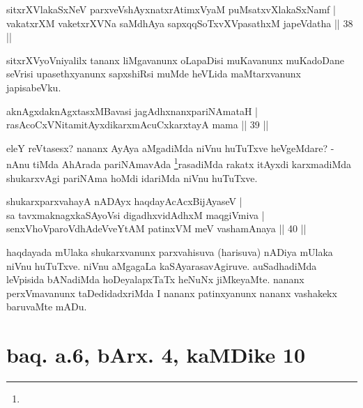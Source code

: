 
\begin{shl}
sitxrXVlakaSxNeV parxveVshAyxnatxrAtimxVyaM puMsatxvXlakaSxNamf | \\
vakatxrXM vaketxrXVNa saMdhAya sapxqqSoTxvXVpasathxM japeVdatha \hfill|| 38 || 
\end{shl}

\begin{artha}
sitxrXVyoVniyalilx tananx liMgavanunx oLapaDisi muKavanunx muKadoDane 
seVrisi upasethxyanunx sapxshiRsi muMde heVLida maMtarxvanunx 
japisabeVku.
\end{artha}


\begin{shl}
aknAgxdaknAgxtasxMBavasi jagAdhxnanxpariNAmataH | \\
rasAcoCxVNitamitAyxdikarxmAcuCxkarxtayA mama \hfill|| 39 || 
\end{shl}

\begin{artha}
eleY reVtasesx? nananx AyAya aMgadiMda niVnu huTuTxve heVgeMdare? - 
nAnu tiMda AhArada pariNAmavAda \footnote[1]{}rasadiMda rakatx itAyxdi 
karxmadiMda shukarxvAgi pariNAma hoMdi idariMda niVnu huTuTxve.
\end{artha}


\begin{shl}
shukarxparxvahayA nADAyx haqdayAcAcxBijAyaseV | \\
sa tavxmaknagxkaSAyoV\s si digadhxvidAdhxM maqgiVmiva | \\
senxVhoVparoVdhAdeVveYtAM patinxVM meV vashamAnaya \hfill|| 40 || 
\end{shl}

\begin{artha}
haqdayada mUlaka shukarxvanunx parxvahisuva (harisuva) nADiya mUlaka 
niVnu huTuTxve. niVnu aMgagaLa kaSAyarasavAgiruve. auSadhadiMda 
leVpisida bANadiMda hoDeyalapxTaTx heNuNx jiMkeyaMte. nananx 
perxVmavanunx taDedidadxriMda I nananx patinxyanunx nananx vashakekx 
baruvaMte mADu.
\end{artha}

\section*{baq. a.6, bArx. 4, kaMDike 10}


